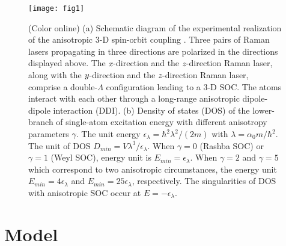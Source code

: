 \documentclass[twocolumn,english,pra,superscriptaddress]{revtex4-1}
\begin{document}
\begin{figure}[t!]
	\texttt{[image: fig1]}%
	\caption{(Color online) (a) Schematic diagram of the experimental realization of the anisotropic 3-D spin-orbit coupling \cite{wang2021realization}. Three pairs of Raman lasers propagating in three directions are polarized in the directions displayed above. The $\emph{x}$-direction and the $\emph{z}$-direction Raman laser, along with the $\emph{y}$-direction and the $\emph{z}$-direction Raman laser, comprise a double-$\Lambda$ configuration leading to a 3-D SOC. The atoms interact with each other through a long-range anisotropic dipole-dipole interaction (DDI). (b) Density of states (DOS) of the lower-branch of single-atom excitation energy with different anisotropy parameters $\gamma$. The unit energy $\epsilon_{\lambda}=\hbar^{2}\lambda^{2}/(2m)$ with $\lambda=\alpha_{0}m/\hbar^{2}$. The unit of DOS $D_{min}=V\lambda^{3}/\epsilon_{\lambda}$. When $\gamma=0$ (Rashba SOC) or $\gamma=1$ (Weyl SOC), energy unit is $E_{min}=\epsilon_{\lambda}$. When  $\gamma=2$ and $\gamma=5$ which correspond to two anisotropic circumstances, the energy unit $E_{min}=4\epsilon_{\lambda}$ and $E_{min}=25\epsilon_{\lambda}$, respectively. The singularities of DOS with anisotropic SOC occur at $E=-\epsilon_{\lambda}.$ 
	}\label{fig1}
\end{figure}

\section{Model}
\end{document}
